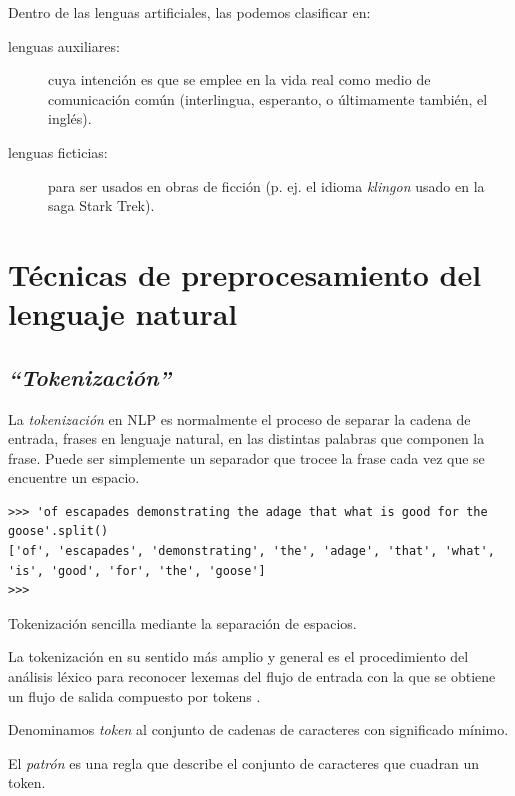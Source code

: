 Dentro de las lenguas artificiales, las podemos clasificar en:
\nopagebreak
\begin{description}
\item[lenguas auxiliares:] cuya intención es que se emplee en la vida real como medio de comunicación común (interlingua, esperanto, o últimamente también, el inglés).
\item[lenguas ficticias:] para ser usados en obras de ficción (p. ej. el idioma \emph{klingon} usado en la saga Stark Trek).
\end{description}


\section{Técnicas de preprocesamiento del lenguaje natural}

\subsection{\emph{``Tokenización''}}

La \emph{tokenización} en NLP es normalmente el proceso de separar la cadena de entrada, frases en lenguaje natural, en las distintas palabras que componen la frase. Puede ser simplemente un separador que trocee la frase cada vez que se encuentre un espacio.
\begin{listing}[H]
\begin{verbatim}
>>> 'of escapades demonstrating the adage that what is good for the goose'.split()
['of', 'escapades', 'demonstrating', 'the', 'adage', 'that', 'what', 'is', 'good', 'for', 'the', 'goose']
>>> 
\end{verbatim}
\caption{Tokenización sencilla mediante la separación de espacios.}
\label{lst:tokenizacion-sencilla}
\end{listing}

La tokenización en su sentido más amplio y general es el procedimiento del análisis léxico para reconocer lexemas del flujo de entrada con la que se obtiene un flujo de salida compuesto por tokens \citep[§2.2]{Jimenez2004}.

\begin{definition}[Token] 
Denominamos \emph{token} al conjunto de cadenas de caracteres con significado mínimo.
\end{definition}

\begin{definition}[Patrón] 
El \emph{patrón} es una regla que describe el conjunto de caracteres que cuadran un token.
\end{definition}

